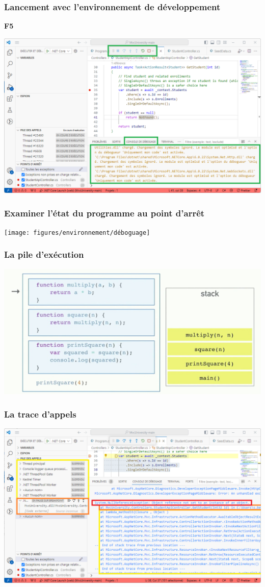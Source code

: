\begin{frame}
    \frametitle{Lancement avec l'environnement de développement}
    \centering
    \Huge
    \textbf{F5}

    \includegraphics[height=0.4\linewidth]{figures/environnement/lancement-du-programme}
\end{frame}

\begin{frame}
    \frametitle{Examiner l'état du programme au point d'arrêt}
    \centering
    \texttt{[image: figures/environnement/déboguage]}
\end{frame}

\begin{frame}
    \frametitle{La pile d'exécution}
    \centering
    \includegraphics[height=0.5\linewidth]{figures/environnement/callstack}
\end{frame}

\begin{frame}
    \frametitle{La trace d'appels}
    \centering
    \includegraphics[height=0.5\linewidth]{figures/environnement/stacktrace}
\end{frame}


